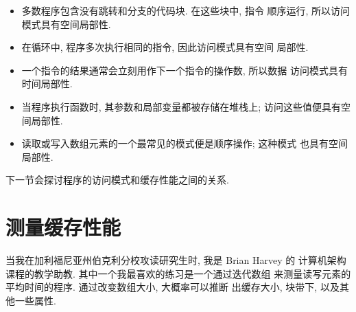 \documentclass[12pt]{book}
\begin{document}
{\begin{itemize}
\item 多数程序包含没有跳转和分支的代码块. 在这些块中, 指令
顺序运行, 所以访问模式具有空间局部性.

\item 在循环中, 程序多次执行相同的指令, 因此访问模式具有空间
局部性.

\item 一个指令的结果通常会立刻用作下一个指令的操作数, 所以数据
访问模式具有时间局部性. 

\item 当程序执行函数时, 其参数和局部变量都被存储在堆栈上;
访问这些值便具有空间局部性.

\item 读取或写入数组元素的一个最常见的模式便是顺序操作; 这种模式
也具有空间局部性. 

\end{itemize}

下一节会探讨程序的访问模式和缓存性能之间的关系.


\section{测量缓存性能}

当我在加利福尼亚州伯克利分校攻读研究生时, 我是 Brian Harvey 的
计算机架构课程的教学助教. 其中一个我最喜欢的练习是一个通过迭代数组
来测量读写元素的平均时间的程序. 通过改变数组大小, 大概率可以推断
出缓存大小, 块带下, 以及其他一些属性. 

}
\end{document}
